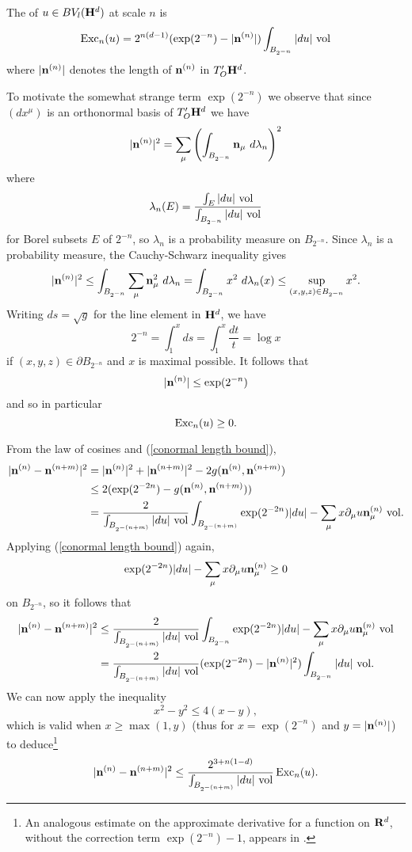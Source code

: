 \begin{definition}
The  of $u \in BV_l(\mathbf H^d)$ at scale $n$ is
$$\operatorname{Exc}_n(u) = 2^{n(d - 1)} (\exp(2^{-n}) - |\mathbf n^{(n)}|) \int_{B_{2^{-n}}} |du| ~\mathrm{vol}$$
where $|\mathbf n^{(n)}|$ denotes the length of $\mathbf n^{(n)}$ in $T_O' \mathbf H^d$.
\end{definition}

To motivate the somewhat strange term $\exp(2^{-n})$ we observe that since $(dx^\mu)$ is an orthonormal basis of $T_O' \mathbf H^d$ we have
$$|\mathbf n^{(n)}|^2 = \sum_\mu \left(\int_{B_{2^{-n}}} \mathbf n_\mu ~d\lambda_n\right)^2$$
where
$$\lambda_n(E) = \frac{\int_E |du|~\mathrm{vol}}{\int_{B_{2^{-n}}} |du| ~\mathrm{vol}}$$
for Borel subsets $E$ of $2^{-n}$, so $\lambda_n$ is a probability measure on $B_{2^{-n}}$.
Since $\lambda_n$ is a probability measure, the Cauchy-Schwarz inequality gives
$$|\mathbf n^{(n)}|^2 \leq \int_{B_{2^{-n}}} \sum_\mu \mathbf n_\mu^2 ~d\lambda_n = \int_{B_{2^{-n}}} x^2 ~d\lambda_n(x) \leq \sup_{(x, y, z) \in B_{2^{-n}}} x^2.$$
Writing $ds = \sqrt g$ for the line element in $\mathbf H^d$, we have
$$2^{-n} = \int_1^x ds = \int_1^x \frac{dt}{t} = \log x$$
if $(x, y, z) \in \partial B_{2^{-n}}$ and $x$ is maximal possible. It follows that
\begin{equation}\label{conormal length bound}
|\mathbf n^{(n)}| \leq \exp(2^{-n})
\end{equation}
and so in particular
$$\operatorname{Exc}_n(u) \geq 0.$$

From the law of cosines and (\ref{conormal length bound}),
\begin{align*}
|\mathbf n^{(n)} - \mathbf n^{(n + m)}|^2 &= |\mathbf n^{(n)}|^2 + |\mathbf n^{(n + m)}|^2 - 2 g(\mathbf n^{(n)}, \mathbf n^{(n + m)})\\
&\leq 2(\exp(2^{-2n}) - g(\mathbf n^{(n)}, \mathbf n^{(n + m)})) \\
&= \frac{2}{\int_{B_{2^{-(n + m)}}} |du| ~\mathrm{vol}} \int_{B_{2^{-(n + m)}}} \exp(2^{-2n}) |du| - \sum_\mu x \partial_\mu u \mathbf n_\mu^{(n)} ~\mathrm{vol}.
\end{align*}
Applying (\ref{conormal length bound}) again,
$$\exp(2^{-2n}) |du| - \sum_\mu x \partial_\mu u \mathbf n_\mu^{(n)} \geq 0$$
on $B_{2^{-n}}$, so it follows that
\begin{align*}
|\mathbf n^{(n)} - \mathbf n^{(n + m)}|^2 &\leq \frac{2}{\int_{B_{2^{-(n + m)}}} |du| ~\mathrm{vol}} \int_{B_{2^{-n }}} \exp(2^{-2n}) |du| - \sum_\mu x \partial_\mu u \mathbf n_\mu^{(n)} ~\mathrm{vol}\\
&= \frac{2}{\int_{B_{2^{-(n + m)}}} |du| ~\mathrm{vol}} (\exp(2^{-2n}) - |\mathbf n^{(n)}|^2) \int_{B_{2^{-n}}} |du| ~\mathrm{vol}.
\end{align*}
We can now apply the inequality
$$x^2 - y^2 \leq 4(x - y),$$
which is valid when $x \geq \max(1, y)$ (thus for $x = \exp(2^{-n})$ and $y = |\mathbf n^{(n)}|$)
to deduce\footnote{An analogous estimate on the approximate derivative for a function on $\mathbf{R}^d$, without the correction term $\exp(2^{-n}) - 1$, appears in \cite[pg661]{Miranda66}.}
\begin{equation}\label{excess bounds Cauchy sequence}
|\mathbf n^{(n)} - \mathbf n^{(n + m)}|^2 \leq \frac{2^{3 + n(1 - d)}}{\int_{B_{2^{-(n + m)}}} |du| ~\mathrm{vol}} \operatorname{Exc}_n(u).
\end{equation}

